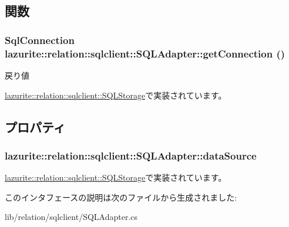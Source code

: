 \subsection{関数}
\hypertarget{interfacelazurite_1_1relation_1_1sqlclient_1_1_s_q_l_adapter_a9749401dc1c4a2334cdb18a5b32f32e9}{
\subsubsection[{getConnection}]{\setlength{\rightskip}{0pt plus 5cm}SqlConnection lazurite::relation::sqlclient::SQLAdapter::getConnection ()}}
\label{interfacelazurite_1_1relation_1_1sqlclient_1_1_s_q_l_adapter_a9749401dc1c4a2334cdb18a5b32f32e9}
\begin{DoxyReturn}{戻り値}

\end{DoxyReturn}


\hyperlink{classlazurite_1_1relation_1_1sqlclient_1_1_s_q_l_storage_a808b3cf0fa1b77858d07792d4a6c78d1}{lazurite::relation::sqlclient::SQLStorage}で実装されています。

\subsection{プロパティ}
\hypertarget{interfacelazurite_1_1relation_1_1sqlclient_1_1_s_q_l_adapter_ab3bcdebb8e41b05a006fde8ce751af03}{
\subsubsection[{dataSource}]{ lazurite::relation::sqlclient::SQLAdapter::dataSource}}
\label{interfacelazurite_1_1relation_1_1sqlclient_1_1_s_q_l_adapter_ab3bcdebb8e41b05a006fde8ce751af03}


\hyperlink{classlazurite_1_1relation_1_1sqlclient_1_1_s_q_l_storage_a3ed27c030a7fbff731edbcc65c7f324e}{lazurite::relation::sqlclient::SQLStorage}で実装されています。

このインタフェースの説明は次のファイルから生成されました:\begin{DoxyCompactItemize}
\item 
lib/relation/sqlclient/SQLAdapter.cs\end{DoxyCompactItemize}
